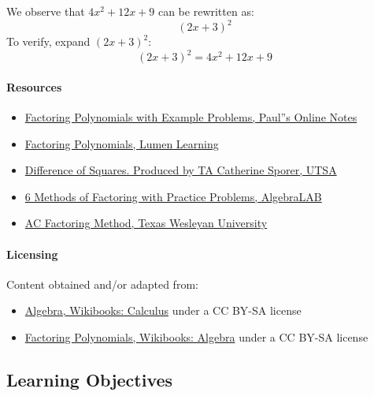 We observe that $4x^2 + 12x + 9$ can be rewritten as:
$$
(2x + 3)^2
$$
To verify, expand $(2x + 3)^2$:
$$
(2x + 3)^2 = 4x^2 + 12x + 9
$$
\paragraph{Resources}

\begin{itemize}
    \item \href{https://tutorial.math.lamar.edu/classes/alg/factoring.aspx}{Factoring Polynomials with Example Problems, Paul''s Online Notes}
    \item \href{https://courses.lumenlearning.com/suny-beginalgebra/chapter/5-2-1-factor-trinomials/}{Factoring Polynomials, Lumen Learning}
    \item \href{https://www.youtube.com/watch?v=shHS-ERFVrc}{Difference of Squares. Produced by TA Catherine Sporer, UTSA}
    \item \href{http://www.algebralab.org/lessons/lesson.aspx?file=algebra_factoring.xml}{6 Methods of Factoring with Practice Problems, AlgebraLAB}
    \item \href{https://txwes.edu/media/twu/content-assets/images/academics/academic-success-center/A-C-Method.pdf}{AC Factoring Method, Texas Wesleyan University}
\end{itemize}

\paragraph{Licensing}

Content obtained and/or adapted from:

\begin{itemize}
    \item \href{https://en.wikibooks.org/wiki/Calculus/Algebra}{Algebra, Wikibooks: Calculus} under a CC BY-SA license
    \item \href{https://en.wikibooks.org/wiki/Algebra/Factoring_Polynomials}{Factoring Polynomials, Wikibooks: Algebra} under a CC BY-SA license
\end{itemize}

\subsection{Learning Objectives}

